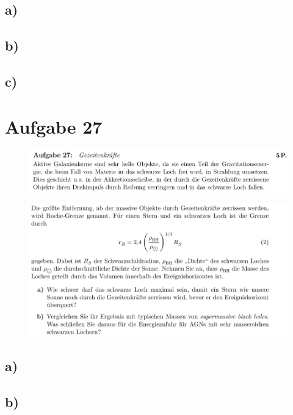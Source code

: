 \subsection{a)}\justifying

\subsection{b)}\justifying

\subsection{c)}\justifying



\section{Aufgabe 27}

    \begin{figure}[H]
        \centering
        \includegraphics[width=\textwidth]{images/Aufgabe27a.jpg}
        \label{fig:4}
    \end{figure}

    \begin{figure}[H]
        \centering
        \includegraphics[width=\textwidth]{images/Aufgabe27b.jpg}
        \label{fig:5}
    \end{figure}

\subsection{a)}\justifying

\subsection{b)}\justifying

